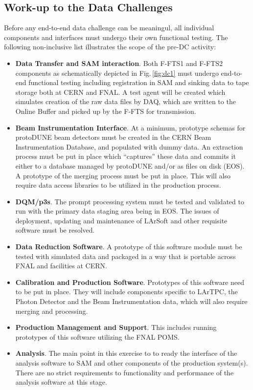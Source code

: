 \documentclass[pdftex,12pt,letter]{article}
\newcommand{\pd}{protoDUNE\xspace}
\begin{document}
\subsection{Work-up to the Data Challenges}
Before any end-to-end data challenge can be meaningul, all individual components and interfaces must undergo
their own functional testing. The following non-inclusive list illustrates the scope of the pre-DC activity:
\begin{itemize}

\item \textbf{Data Transfer and SAM interaction}.  Both F-FTS1 and F-FTS2 components as schematically depicted in Fig.\,\ref{fig:dc1}
must undergo end-to-end functional testing including registration in SAM and sinking data to tape storage both at CERN and FNAL. A test
agent will be created which simulates creation of the raw data files by DAQ, which are written to the Online Buffer and picked up
by the F-FTS for transmission.

\item \textbf{Beam Instrumentation Interface}. At a minimum, prototype schemas for \pd beam detectors must be created in
the CERN Beam Instrumentation Database, and populated with dummy data. An extraction process must be put in place which
``captures'' these data and commits it either to a database managed by \pd and/or as files on disk (EOS). A prototype
of the merging process must be put in place. This will also require data access libraries to be utilized in the production process.

\item  \textbf{DQM/p3s}. The prompt processing system must be tested and validated to run with the primary data
staging area being in EOS. The issues of deployment, updating and maintenance of LArSoft and other requisite software
must be resolved.

\item  \textbf{Data Reduction Software}.
A prototype of this software module must be tested with simulated data and packaged in a way that is portable across
FNAL and facilities at CERN.

\item  \textbf{Calibration and Production Software}. Prototypes of this software need to be put in place. They will
include components specific to LArTPC, the Photon Detector and the Beam Instrumentation data, which will also require
merging and processing.

\item  \textbf{Production Management and Support}. This includes running prototypes of this software utilizing the FNAL POMS.

\item  \textbf{Analysis}. The main point in this exercise to to ready the interface of the analysis software to SAM and other
components of the production system(s). There are no strict requirements to functionality and performance of the analysis
software at this stage.

\end{itemize}
\end{document}
